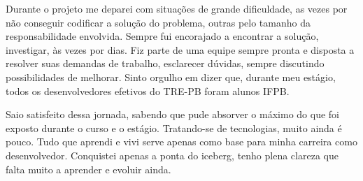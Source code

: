 Durante o projeto me deparei com situações de grande dificuldade, as vezes por não conseguir codificar a solução do problema, outras pelo tamanho da responsabilidade envolvida. Sempre fui encorajado a encontrar a solução, investigar, às vezes por dias.
Fiz parte de uma equipe sempre pronta e disposta a resolver suas demandas de trabalho, esclarecer dúvidas, sempre discutindo possibilidades de melhorar. Sinto orgulho em dizer que, durante meu estágio, todos os desenvolvedores efetivos do TRE-PB foram alunos IFPB.

Saio satisfeito dessa jornada, sabendo que pude absorver o máximo do que foi exposto durante o curso e o estágio. Tratando-se de tecnologias, muito ainda é pouco. Tudo que aprendi e vivi serve apenas como base para minha carreira como desenvolvedor. Conquistei apenas a ponta do iceberg, tenho plena clareza que falta muito a aprender e evoluir ainda. 